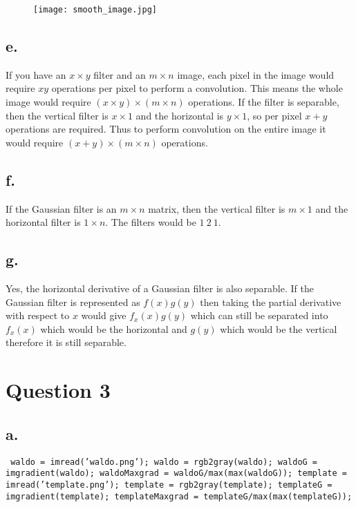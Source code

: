 \documentclass{article}
\begin{document}
\begin{figure}[h!]
\centering
\texttt{[image: smooth\_image.jpg]}
\label{fig:sample graph}
\end{figure}


\newpage
\subsection*{e.}
If you have an $x \times y$ filter and an $m \times n$ image, each pixel in the image would require $xy$ operations per pixel to perform a convolution. This means the whole image would require $(x\times y) \times (m \times n) $ operations. If the filter is separable, then the vertical filter is $x \times 1$ and the horizontal is $y \times 1$, so per pixel $x+y$ operations are required. Thus to perform convolution on the entire image it would require $(x + y) \times (m \times n)$ operations.

\subsection*{f.}
If the Gaussian filter is an $m \times n$ matrix, then the vertical filter is $m \times 1$ and the horizontal filter is $1 \times n$. The filters would be $1\ 2\ 1$.

\subsection*{g.}
Yes, the horizontal derivative of a Gaussian filter is also separable. If the Gaussian filter is represented as $f(x)g(y)$ then taking the partial derivative with respect to $x$ would give $f_{x}(x)g(y)$ which can still be separated into $f_{x}(x)$ which would be the horizontal and $g(y)$ which would be the vertical therefore it is still separable.

\newpage
\section*{Question 3}
\subsection*{a.}
\texttt{
\newline\noindent
waldo = imread('waldo.png');
\newline
waldo = rgb2gray(waldo);
\newline
waldoG = imgradient(waldo);
\newline
waldoMaxgrad =  waldoG/max(max(waldoG));
\newline\newline
template = imread('template.png');
\newline
template = rgb2gray(template);
\newline
templateG = imgradient(template);
\newline
templateMaxgrad =  templateG/max(max(templateG));
}
\end{document}
